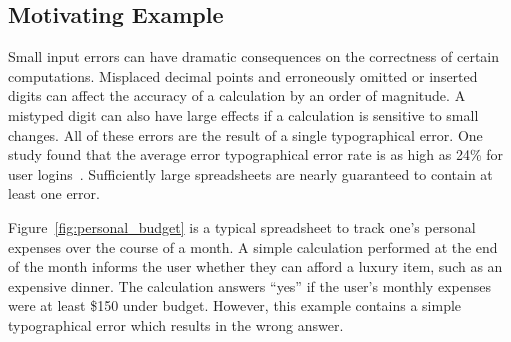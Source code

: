 \subsection{Motivating Example}

Small input errors can have dramatic consequences on the correctness of certain computations.  Misplaced decimal points and erroneously omitted or inserted digits can affect the accuracy of a calculation by an order of magnitude.  A mistyped digit can also have large effects if a calculation is sensitive to small changes.  All of these errors are the result of a single typographical error.  One study found that the average error typographical error rate is as high as 24\% for user logins~\cite{Robinson:1998:CUV:2229220.2229465}.  Sufficiently large spreadsheets are nearly guaranteed to contain at least one error.

Figure~\ref{fig:personal_budget} is a typical spreadsheet to track one's personal expenses over the course of a month.  A simple calculation performed at the end of the month informs the user whether they can afford a luxury item, such as an expensive dinner.  The calculation answers ``yes'' if the user's monthly expenses were at least \$150 under budget.  However, this example contains a simple typographical error which results in the wrong answer.

